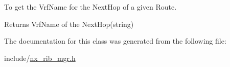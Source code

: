 To get the Vrf\+Name for the Next\+Hop of a given Route.

\begin{DoxyReturn}{Returns}
Vrf\+Name of the Next\+Hop(string)
\end{DoxyReturn}

 

The documentation for this class was generated from the following file\+:\begin{DoxyCompactItemize}
\item 
include/\mbox{\hyperlink{nx__rib__mgr_8h}{nx\+\_\+rib\+\_\+mgr.\+h}}\end{DoxyCompactItemize}
